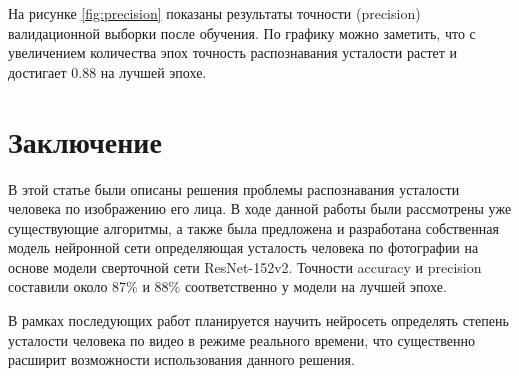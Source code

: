 \documentclass[12pt, letterpaper]{article}
\begin{document}
    На рисунке \ref{fig:precision} показаны результаты точности (precision) валидационной выборки после обучения. По графику можно заметить, что с увеличением количества эпох точность распознавания усталости растет и достигает 0.88 на лучшей эпохе.
 
\section{Заключение}\label{sec:conclusion}

    В этой статье были описаны решения проблемы распознавания усталости человека по изображению его лица.
    В ходе данной работы были рассмотрены уже существующие алгоритмы, а также была предложена и разработана собственная модель нейронной сети определяющая усталость человека по фотографии на основе модели сверточной сети ResNet-152v2. Точности accuracy и precision составили около 87\% и 88\% соответственно у модели на лучшей эпохе.
    
    В рамках последующих работ планируется научить нейросеть определять степень усталости человека по видео в режиме реального времени, что существенно расширит возможности использования данного решения. 
 
\printbibliography
    
\end{document}
